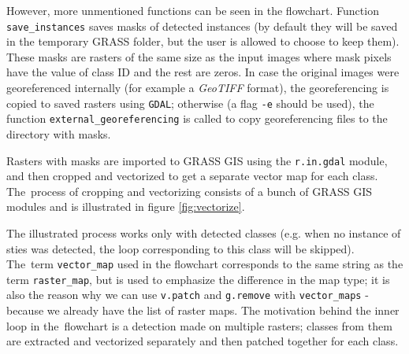 However, more unmentioned functions can be seen in the flowchart. Function
\verb|save_instances| saves masks of detected instances (by default they will be 
saved in the temporary GRASS folder, but the user is allowed to choose to keep 
them). These masks are rasters of the same size as the input images where mask 
pixels have the value of class ID and the rest are zeros. In case the original 
images were georeferenced internally (for example a \textit{GeoTIFF} format), 
the georeferencing is copied to saved rasters using \verb|GDAL|; otherwise (a 
flag \verb|-e| should be used), the function \verb|external_georeferencing| is 
called to copy georeferencing files to the directory with masks.

Rasters with masks are imported to GRASS GIS using the \verb|r.in.gdal| module, 
and then cropped and vectorized to get a separate vector map for each class. The~process
of cropping and vectorizing consists of a bunch of GRASS GIS modules and 
is illustrated in figure \ref{fig:vectorize}.

The illustrated process works only with detected classes (e.g. when no instance 
of sties was detected, the loop corresponding to this class will be skipped). 
The~term \verb|vector_map| used in the flowchart corresponds to the same string 
as the term \verb|raster_map|, but is used to emphasize the difference in the 
map type; it is also the reason why we can use \verb|v.patch| and 
\verb|g.remove| with \verb|vector_maps| - because we already have the list of 
raster maps. The motivation behind the inner loop in the~flowchart is a 
detection made on multiple rasters; classes from them are extracted and 
vectorized separately and then patched together for each class.


